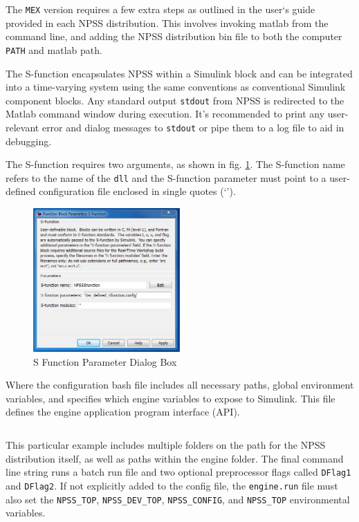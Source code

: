 \documentclass[heading.tex]{subfiles}
\begin{document}
The \texttt{MEX} version requires a few extra steps as outlined in the user`s
guide provided in each NPSS distribution.\cite{Sfunc}
This involves invoking matlab from the command line,
and adding the NPSS distribution bin file to both the computer
\texttt{PATH} and matlab path.

The S-function encapsulates NPSS within a Simulink block and can be integrated into a time-varying
system using the same conventions as conventional Simulink component blocks.
Any standard output \texttt{stdout} from NPSS is redirected to the Matlab command window during execution. 
It's recommended to print any user-relevant error and dialog messages to \texttt{stdout}
or pipe them to a log file to aid in debugging.

The S-function requires two arguments, as shown in fig. \ref{f:DialogBox}.
The S-function name refers to the name of the \texttt{dll} and the S-function parameter must point
to a user-defined configuration file enclosed in single quotes (`').

\begin{figure}[H]
\centering
\includegraphics[width=0.5\textwidth]{images/SFuncDialog}
\caption{S Function Parameter Dialog Box}
\label{f:DialogBox}
\end{figure}

Where the configuration bash file includes all necessary paths, global environment variables, and specifies
which engine variables to expose to Simulink. This file defines the engine application program interface (API).

 \begin{adjustwidth}{-1cm}{-1cm}
 \inputminted[]{bash}{code/engineConfig.bat}
 \end{adjustwidth} 

This particular example includes multiple folders on the path for the NPSS distribution itself,
as well as paths within the engine folder.
The final command line string runs a batch run file and two optional preprocessor flags called \texttt{DFlag1}
and \texttt{DFlag2}. If not explicitly added to the config file, the \texttt{engine.run} file must also set
the \texttt{NPSS\_TOP}, \texttt{NPSS\_DEV\_TOP}, \texttt{NPSS\_CONFIG}, and \texttt{NPSS\_TOP} environmental variables.
\end{document}
